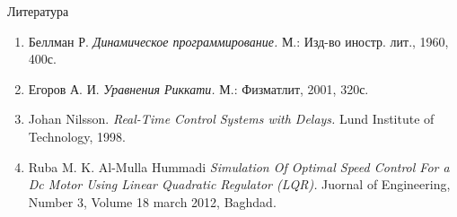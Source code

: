         \begin{frame}{Литература}
                \begin{enumerate}
                \item Беллман Р. \textit{Динамическое программирование.} М.: Изд-во иностр. лит., 1960, 400с.

                \item  Егоров А. И. \textit{Уравнения Риккати.} М.: Физматлит, 2001, 320с.

                \item Johan Nilsson. \textit{Real-Time Control Systems with Delays.} Lund Institute of Technology, 1998.


                \item Ruba M. K. Al-Mulla Hummadi \textit{Simulation Of Optimal Speed Control For a Dc Motor Using Linear Quadratic Regulator (LQR).} Juornal of Engineering, Number 3, Volume 18 march 2012, Baghdad.
                \end{enumerate}
        \end{frame}
